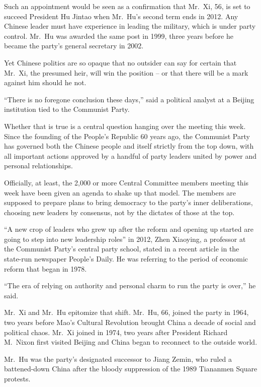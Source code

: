 ﻿\documentclass[12pt]{article}
\begin{document}
Such an appointment would be seen as a confirmation that Mr.~Xi, 56, is set to succeed President Hu
Jintao when Mr.~Hu's second term ends in 2012. Any Chinese leader must have experience in leading
the military, which is under party control. Mr.~Hu was awarded the same post in 1999, three years
before he became the party's general secretary in 2002.

Yet Chinese politics are so opaque\cite{opaque} that no outsider can say for certain that Mr.~Xi,
the presumed heir, will win the position -- or that there will be a mark against him should he not.

``There is no foregone conclusion these days,'' said a political analyst at a Beijing institution
tied to the Communist Party.

Whether that is true is a central question hanging over the meeting this week. Since the founding of
the People's Republic 60 years ago, the Communist Party has governed both the Chinese people and
itself strictly from the top down, with all important actions approved by a handful of party leaders
united by power and personal relationships.

Officially, at least, the 2,000 or more Central Committee members meeting this week have been given
an agenda to shake up that model. The members are supposed to prepare plans to bring democracy to
the party's inner deliberations, choosing new leaders by consensus, not by the dictates of those at
the top.

``A new crop of leaders who grew up after the reform and opening up started are going to step into
new leadership roles'' in 2012, Zhen Xiaoying, a professor at the Communist Party's central party
school, stated in a recent article in the state-run newspaper People's Daily. He was referring to
the period of economic reform that began in 1978.

``The era of relying on authority and personal charm to run the party is over,'' he said.

Mr.~Xi and Mr.~Hu epitomize that shift. Mr.~Hu, 66, joined the party in 1964, two years before Mao's
Cultural Revolution brought China a decade of social and political chaos. Mr.~Xi joined in 1974, two
years after President Richard M.~Nixon first visited Beijing and China began to reconnect to the
outside world.

Mr.~Hu was the party's designated successor to Jiang Zemin, who ruled a battened-down China after
the bloody suppression of the 1989 Tiananmen Square protests.
\end{document}

